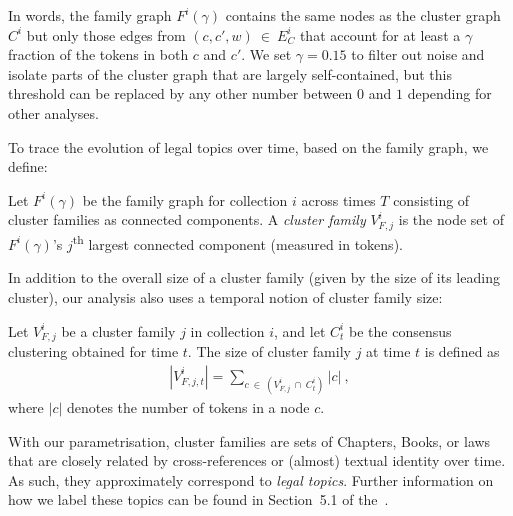 In words, the family graph $F^i(\gamma)$ contains the same nodes as the cluster graph $C^i$ 
but only those edges from $(c,c',w)~\in~E^i_C$ that account for at least a $\gamma$ fraction of the tokens in both $c$ and $c'$. 
We set $\gamma = 0.15$ to filter out noise and isolate parts of the cluster graph that are largely self-contained,
but this threshold can be replaced by any other number between $0$ and $1$ depending for other analyses.

To trace the evolution of legal topics over time, based on the family graph, we define:

\begin{definition}\label{def:cluster-family}
	Let $F^i(\gamma)$ be the family graph for collection $i$ across times $T$ consisting of cluster families as connected components.
	A \emph{cluster family} $V^i_{F,j}$ is the node set of $F^i(\gamma)$'s $j$\textsuperscript{th} largest connected component (measured in tokens).
\end{definition} 

In addition to the overall size of a cluster family (given by the size of its leading cluster), 
our analysis also uses a temporal notion of cluster family size:

\begin{definition}\label{def:cluster-family-size}
	Let $V^i_{F,j}$ be a cluster family $j$ in collection $i$, 
	and let $C^i_t$ be the consensus clustering obtained for time $t$.
	The size of cluster family $j$ at time $t$ is defined as
	\begin{align*}
	|V^i_{F,j,t}| = \sum_{c~\in~(V^i_{F,j}~\cap~C^i_t)}|c|~,
	\end{align*}
	where $|c|$ denotes the number of tokens in a node $c$. 
\end{definition}

With our parametrisation, cluster families are sets of Chapters, Books, or laws that are closely related by cross-references or (almost) textual identity over time.
As such, they approximately correspond to \emph{legal topics}.
Further information on how we label these topics can be found in Section~5.1 of the~\suppi. 
